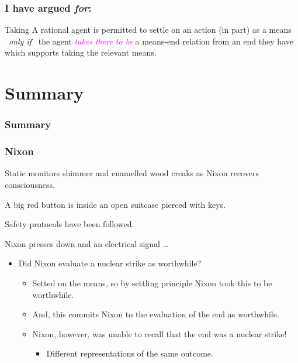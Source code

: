 \documentclass[noamssymb,
]{beamer} %
\newcommand{\hozlinedash}[0]{%
  \noindent\hdashrule[0.5ex][c]{\textwidth}{.1pt}{2.5pt}
}
\begin{document}
\begin{frame}
  \frametitle{I have argued \emph{for}:}
    \begin{block}{Taking}
    A rational agent is permitted to settle on an action (in part) as a means
    \newline
    \mbox{ }\hfill\emph{only if}\hfill\mbox{ }
    \newline
    the agent \textcolor{fuchsia}{\emph{takes there to be}} a means-end relation from an end they have which supports taking the relevant means.
  \end{block}
\end{frame}

\section{Summary}
\label{sec:summary}


\begin{frame}
  \frametitle{Summary}


\end{frame}


\begin{frame}
  \frametitle{Nixon}

  {\rmfamily
    Static monitors shimmer and enamelled wood creaks as Nixon recovers consciousness.

    A big red button is inside an open suitcase pierced with keys.

    Safety protocols have been followed.

    Nixon presses down and an electrical signal \dots
  }

  \pause
  \hozlinedash

  \begin{itemize}
  \item<+-> Did Nixon evaluate a nuclear strike as worthwhile?
    \begin{itemize}
    \item<+-> Setted on the means, so by settling principle Nixon took this to be worthwhile.
    \item<+-> And, this commits Nixon to the evaluation of the end as worthwhile.
    \item<+-> Nixon, however, was unable to recall that the end was a nuclear strike!
      \begin{itemize}
      \item<+-> Different representations of the same outcome.
      \end{itemize}
    \end{itemize}
  \end{itemize}
\end{frame}
\end{document}
